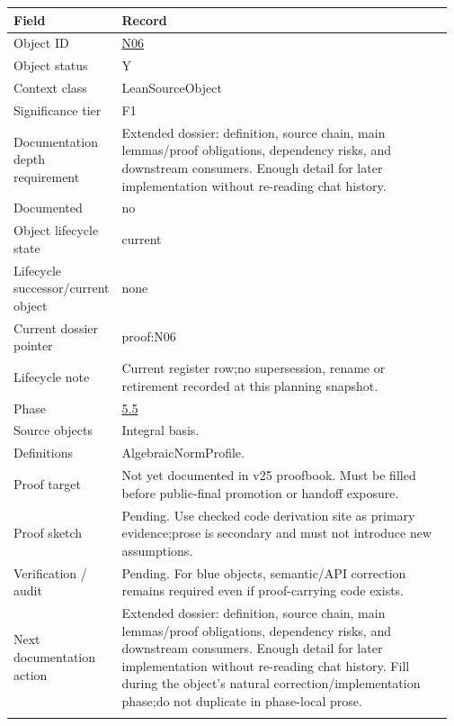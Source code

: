 \begin{longtable}{L{0.16\linewidth} L{0.81\linewidth}}
\hline
\textbf{Field} & \textbf{Record}\\
\hline
Object ID & \hyperlink{object-row-N06}{N06}\\
\hline\addlinespace[0.20em]
Object status & Y\\
\hline\addlinespace[0.20em]
Context class & LeanSourceObject\\
\hline\addlinespace[0.20em]
Significance tier & F1\\
\hline\addlinespace[0.20em]
Documentation depth requirement & Extended dossier: definition, source chain, main lemmas/\allowbreak{}proof obligations, dependency risks, and downstream consumers. Enough detail for later implementation without re-reading chat history.\\
\hline\addlinespace[0.20em]
Documented & no\\
\hline\addlinespace[0.20em]
Object lifecycle state & current\\
\hline\addlinespace[0.20em]
Lifecycle successor/\allowbreak{}current object & none\\
\hline\addlinespace[0.20em]
Current dossier pointer & proof:N06\\
\hline\addlinespace[0.20em]
Lifecycle note & Current register row;\newline no supersession, rename or retirement recorded at this planning snapshot.\\
\hline\addlinespace[0.20em]
Phase & \hyperlink{phase-row-5-5}{5.5}\\
\hline\addlinespace[0.20em]
Source objects & Integral basis.\\
\hline\addlinespace[0.20em]
Definitions & AlgebraicNormProfile.\\
\hline\addlinespace[0.20em]
Proof target & Not yet documented in v25 proofbook. Must be filled before public-final promotion or handoff exposure.\\
\hline\addlinespace[0.20em]
Proof sketch & Pending. Use checked code derivation site as primary evidence;\newline prose is secondary and must not introduce new assumptions.\\
\hline\addlinespace[0.20em]
Verification /\allowbreak{} audit & Pending. For blue objects, semantic/\allowbreak{}API correction remains required even if proof-carrying code exists.\\
\hline\addlinespace[0.20em]
Next documentation action & Extended dossier: definition, source chain, main lemmas/\allowbreak{}proof obligations, dependency risks, and downstream consumers. Enough detail for later implementation without re-reading chat history. Fill during the object's natural correction/\allowbreak{}implementation phase;\newline do not duplicate in phase-local prose.\\
\hline\addlinespace[0.20em]
\end{longtable}
